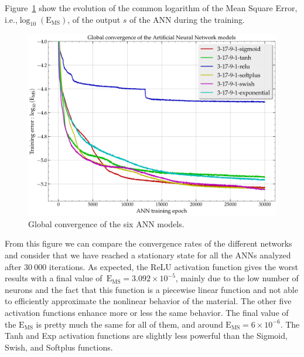 \documentclass[algorithms,article,submit,pdftex,oneauthors]{Definitions/mdpi}
\makeatletter
\DeclareRobustCommand{\ie}{i.e.,\@\xspace}
\DeclareRobustCommand{\MSE}{\text{E}_\text{MS}}
\makeatother
\begin{document}
Figure~\ref{fig:ANN-conv} show the evolution of the common logarithm of the Mean Square Error, \ie $\log_{10}(\MSE)$, of the output $s$ of the ANN during the training.
\begin{figure}[h!]
\centering
\includegraphics[width=0.8\columnwidth]{Figures/3Cr2Mo-convergence-17-9}
\caption{Global convergence of the six ANN models.}
\label{fig:ANN-conv}
\end{figure}
From this figure we can compare the convergence rates of the different networks and consider that we have reached a stationary state for all the ANNs analyzed after $30~000$ iterations.
As expected, the ReLU activation function gives the worst results with a final value of~$\MSE=3.092\times10^{-5}$, mainly due to the low number of neurons and the fact that this function is a piecewise linear function and not able to efficiently approximate the nonlinear behavior of the material.
The other five activation functions enhance more or less the same behavior.
The final value of the $\MSE$ is pretty much the same for all of them, and around $\MSE=6\times10^{-6}$.
The Tanh and Exp activation functions are slightly less powerful than the Sigmoid, Swish, and Softplus functions.
\end{document}
